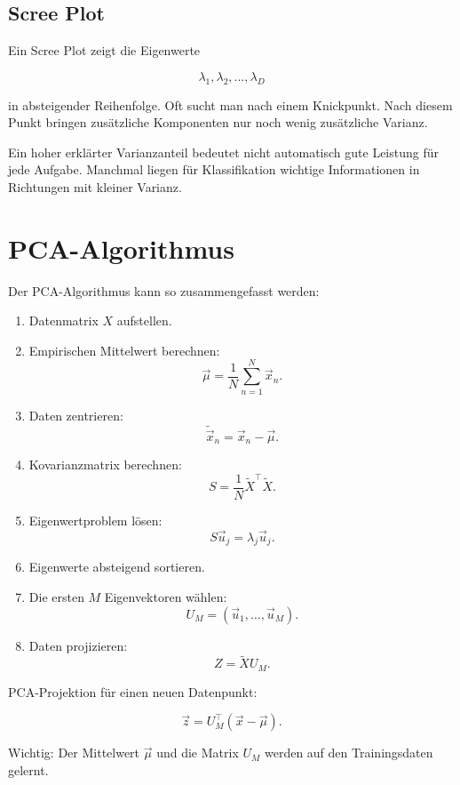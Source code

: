\subsection{Scree Plot}

Ein Scree Plot zeigt die Eigenwerte

\[
    \lambda_1,\lambda_2,\dots,\lambda_D
\]

in absteigender Reihenfolge.
Oft sucht man nach einem Knickpunkt.
Nach diesem Punkt bringen zusätzliche Komponenten nur noch wenig zusätzliche Varianz.

\begin{notebox}
Ein hoher erklärter Varianzanteil bedeutet nicht automatisch gute Leistung für jede Aufgabe.
Manchmal liegen für Klassifikation wichtige Informationen in Richtungen mit kleiner Varianz.
\end{notebox}

\section{PCA-Algorithmus}

Der PCA-Algorithmus kann so zusammengefasst werden:

\begin{enumerate}
    \item Datenmatrix \(X\) aufstellen.
    \item Empirischen Mittelwert berechnen:
    \[
        \vec{\mu}
        =
        \frac{1}{N}
        \sum_{n=1}^{N}
        \vec{x}_n.
    \]
    \item Daten zentrieren:
    \[
        \tilde{\vec{x}}_n
        =
        \vec{x}_n-\vec{\mu}.
    \]
    \item Kovarianzmatrix berechnen:
    \[
        S
        =
        \frac{1}{N}
        \tilde{X}^{\top}\tilde{X}.
    \]
    \item Eigenwertproblem lösen:
    \[
        S\vec{u}_j
        =
        \lambda_j\vec{u}_j.
    \]
    \item Eigenwerte absteigend sortieren.
    \item Die ersten \(M\) Eigenvektoren wählen:
    \[
        U_M
        =
        (\vec{u}_1,\dots,\vec{u}_M).
    \]
    \item Daten projizieren:
    \[
        Z
        =
        \tilde{X}U_M.
    \]
\end{enumerate}

\begin{definitionbox}
PCA-Projektion für einen neuen Datenpunkt:

\[
    \vec{z}
    =
    U_M^{\top}(\vec{x}-\vec{\mu}).
\]

Wichtig:
Der Mittelwert \(\vec{\mu}\) und die Matrix \(U_M\) werden auf den Trainingsdaten gelernt.
\end{definitionbox}

